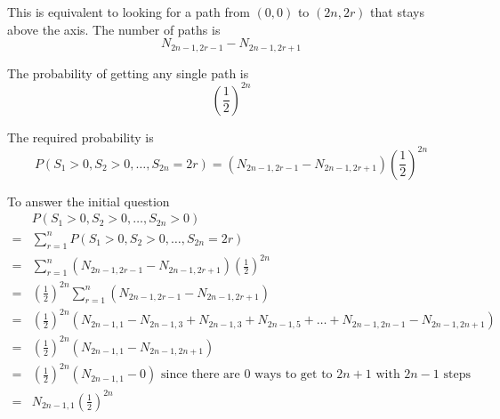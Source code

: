 This is equivalent to looking for a path from $(0, 0) $ to $(2n, 2r)$ that stays above the axis. The number of paths is
\[
   N_{2n -1, 2r -1} - N_{2n - 1, 2r + 1}
\] 

The probability of getting any single path is
\[
   \left( \frac{1}{2}\right)^{2n}
\] 

The required probability is
\[
   P(S_1 > 0, S_2 > 0, \hdots, S_{2n} = 2r ) = \left( N_{2n -1, 2r -1} - N_{2n - 1, 2r + 1} \right) \left( \frac{1}{2} \right)^{2n}
\] 

To answer the initial question
\begin{align*}
   & P(S_1 > 0, S_2 > 0, \hdots, S_{2n} > 0)  \\
   =&  \sum_{r = 1}^{n} P(S_1 > 0, S_2 > 0, \hdots, S_{2n} = 2r )  \\
   =& \sum_{r = 1}^n \left( N_{2n -1, 2r -1} - N_{2n - 1, 2r + 1} \right) \left( \frac{1}{2} \right)^{2n} \\
   =& \left( \frac{1}{2} \right)^{2n} \sum_{r = 1}^n \left( N_{2n -1, 2r -1} - N_{2n - 1, 2r + 1} \right) \\ 
   =& \left( \frac{1}{2} \right)^{2n} \left( N_{2n -1, 1} - N_{2n -1, 3}  + N_{2n -1, 3} + N_{2n -1, 5} + \hdots + N_{2n -1, 2n -1} - N_{2n - 1, 2n + 1}\right) \\ 
   =& \left( \frac{1}{2} \right)^{2n} \left( N_{2n -1, 1} - N_{2n -1, 2n + 1}\right)  \\
   =& \left( \frac{1}{2} \right)^{2n} \left( N_{2n -1, 1} - 0 \right) \text{ since there are $0$ ways to get to $2n + 1$ with $2n - 1$ steps}\\
   =& N_{2n - 1, 1} \left( \frac{1}{2} \right)^{2n}
\end{align*}

